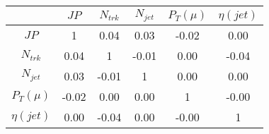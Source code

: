\begin{tabular}{|c|c|c|c|c|c|} 
\hline
 & $JP$ & $N_{trk}$ & $N_{jet}$ & $P_{T} (\mu)$ & $\eta (jet)$ \\ \hline
$JP$ & 1 & 0.04 & 0.03 & -0.02 & 0.00 \\
$N_{trk}$ & 0.04 & 1 & -0.01 & 0.00 & -0.04 \\
$N_{jet}$ & 0.03 & -0.01 & 1 & 0.00 & 0.00 \\
$P_{T} (\mu)$ & -0.02 & 0.00 & 0.00 & 1 & -0.00 \\
$\eta (jet)$ & 0.00 & -0.04 & 0.00 & -0.00 & 1 \\
\hline 
\end{tabular} 


